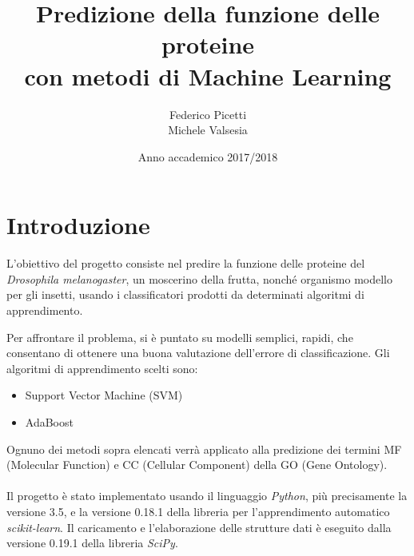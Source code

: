 \documentclass[12pt,a4paper,oneside,hidelinks]{report}
\begin{document}

\title{%
        Predizione della funzione delle proteine \\
        con metodi di Machine Learning}
  
\author{Federico Picetti \\
        Michele Valsesia}

\date{Anno accademico 2017/2018} 

\maketitle

\tableofcontents


\newpage

\section*{Introduzione}
L'obiettivo del progetto consiste nel predire la funzione delle proteine del \textit{Drosophila melanogaster}, un moscerino della frutta, nonché organismo modello per gli insetti, usando i classificatori prodotti da determinati algoritmi di apprendimento. 

Per affrontare il problema, si è puntato su modelli semplici, rapidi, che consentano di ottenere una buona valutazione dell'errore di classificazione. Gli algoritmi di apprendimento scelti sono: 

\begin{itemize}
    \item Support Vector Machine (SVM)
    \item AdaBoost
\end{itemize}

Ognuno dei metodi sopra elencati verrà applicato alla predizione dei termini MF (Molecular Function) e CC (Cellular Component) della GO (Gene Ontology).

\paragraph*{}
Il progetto è stato implementato usando il linguaggio \textit{Python}, più precisamente la versione 3.5, e la versione 0.18.1 della libreria per l'apprendimento automatico \textit{scikit-learn}. Il caricamento e l'elaborazione delle strutture dati è eseguito dalla versione 0.19.1 della libreria \textit{SciPy}.
\end{document}

